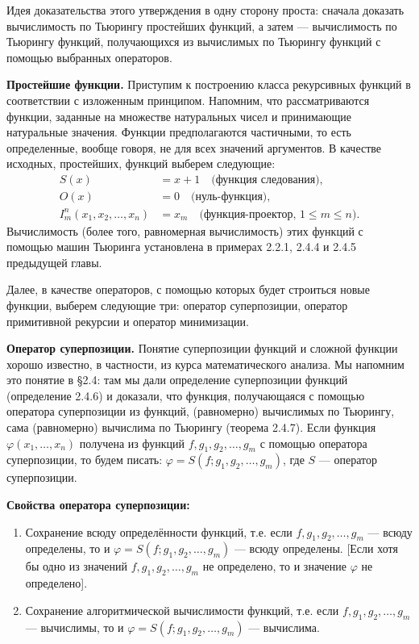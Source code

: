 \documentclass[a4paper,12pt]{article}
\begin{document}
Идея доказательства этого утверждения в одну сторону проста: сначала доказать вычислимость по Тьюрингу простейших функций, а затем --- вычислимость по Тьюрингу функций, получающихся из вычислимых по Тьюрингу функций с помощью выбранных операторов.

\textbf{Простейшие функции.} Приступим к построению класса рекурсивных функций в соответствии с изложенным принципом. Напомним, что рассматриваются функции, заданные на множестве натуральных чисел и принимающие натуральные значения. Функции предполагаются частичными, то есть определенные, вообще говоря, не для всех значений аргументов. В качестве исходных, простейших, функций выберем следующие:
\begin{align*}
S(x) &= x + 1 \quad \text{(функция следования),} \\
O(x) &= 0 \quad \text{(нуль-функция),} \\
I_m^n(x_1, x_2, \dots, x_n) &= x_m \quad \text{(функция-проектор, } 1 \le m \le n \text{).}
\end{align*}
Вычислимость (более того, равномерная вычислимость) этих функций с помощью машин Тьюринга установлена в примерах 2.2.1, 2.4.4 и 2.4.5 предыдущей главы.

Далее, в качестве операторов, с помощью которых будет строиться новые функции, выберем следующие три: оператор суперпозиции, оператор примитивной рекурсии и оператор минимизации.

\textbf{Оператор суперпозиции.} Понятие суперпозиции функций и сложной функции хорошо известно, в частности, из курса математического анализа. Мы напомним это понятие в §2.4: там мы дали определение суперпозиции функций (определение 2.4.6) и доказали, что функция, получающаяся с помощью оператора суперпозиции из функций, (равномерно) вычислимых по Тьюрингу, сама (равномерно) вычислима по Тьюрингу (теорема 2.4.7). Если функция \(\varphi(x_1, \dots, x_n)\) получена из функций \(f, g_1, g_2, \dots, g_m\) с помощью оператора суперпозиции, то будем писать: \(\varphi = S(f; g_1, g_2, \dots, g_m)\), где \(S\) --- оператор суперпозиции.

\textbf{Свойства оператора суперпозиции:}
\begin{enumerate}
    \item Сохранение всюду определённости функций, т.е. если \(f, g_1, g_2, \dots, g_m\) --- всюду определены, то и \(\varphi = S(f; g_1, g_2, \dots, g_m)\) --- всюду определены. [Если хотя бы одно из значений \(f, g_1, g_2, \dots, g_m\) не определено, то и значение \(\varphi\) не определено].
    \item Сохранение алгоритмической вычислимости функций, т.е. если \(f, g_1, g_2, \dots, g_m\) --- вычислимы, то и \(\varphi = S(f; g_1, g_2, \dots, g_m)\) --- вычислима.
\end{enumerate}
\end{document}
